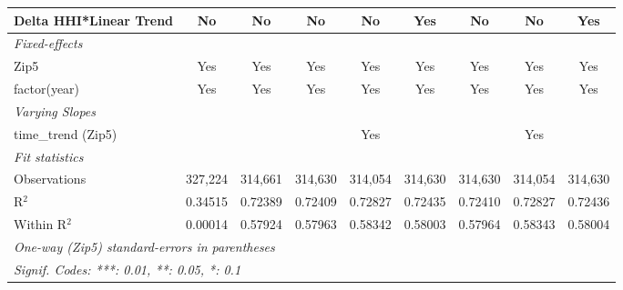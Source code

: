 \begin{table}[H]
{\begin{tabular}{lcccccccc}
 Delta HHI*Linear Trend & No & No & No & No & Yes & No & No & Yes\\ 

 \midrule \emph{Fixed-effects}&   &   &   &   &   &   &   &  \\ 

 Zip5 & Yes & Yes & Yes & Yes & Yes & Yes & Yes & Yes\\ 

 factor(year) & Yes & Yes & Yes & Yes & Yes & Yes & Yes & Yes\\ 

 \midrule \emph{Varying Slopes}&   &   &   &   &   &   &   &  \\ 

 time\_trend (Zip5) &  &  &  & Yes &  &  & Yes & \\ 

 \midrule \emph{Fit statistics}&  & & & & & & & \\ 

 Observations & 327,224&314,661&314,630&314,054&314,630&314,630&314,054&314,630\\ 

 R$^2$ & 0.34515&0.72389&0.72409&0.72827&0.72435&0.72410&0.72827&0.72436\\ 

 Within R$^2$ & 0.00014&0.57924&0.57963&0.58342&0.58003&0.57964&0.58343&0.58004\\ 

 \midrule\midrule\multicolumn{9}{l}{\emph{One-way (Zip5) standard-errors in parentheses}}\\ 

 \multicolumn{9}{l}{\emph{Signif. Codes: ***: 0.01, **: 0.05, *: 0.1}}\\ 

 \end{tabular}} 

 \end{table} 

  

